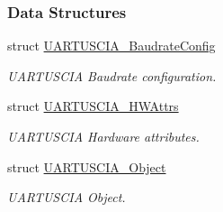 \subsubsection*{Data Structures}
\begin{DoxyCompactItemize}
\item 
struct \hyperlink{struct_u_a_r_t_u_s_c_i_a___baudrate_config}{U\+A\+R\+T\+U\+S\+C\+I\+A\+\_\+\+Baudrate\+Config}
\begin{DoxyCompactList}\small\item\em U\+A\+R\+T\+U\+S\+C\+I\+A Baudrate configuration. \end{DoxyCompactList}\item 
struct \hyperlink{struct_u_a_r_t_u_s_c_i_a___h_w_attrs}{U\+A\+R\+T\+U\+S\+C\+I\+A\+\_\+\+H\+W\+Attrs}
\begin{DoxyCompactList}\small\item\em U\+A\+R\+T\+U\+S\+C\+I\+A Hardware attributes. \end{DoxyCompactList}\item 
struct \hyperlink{struct_u_a_r_t_u_s_c_i_a___object}{U\+A\+R\+T\+U\+S\+C\+I\+A\+\_\+\+Object}
\begin{DoxyCompactList}\small\item\em U\+A\+R\+T\+U\+S\+C\+I\+A Object. \end{DoxyCompactList}\end{DoxyCompactItemize}
